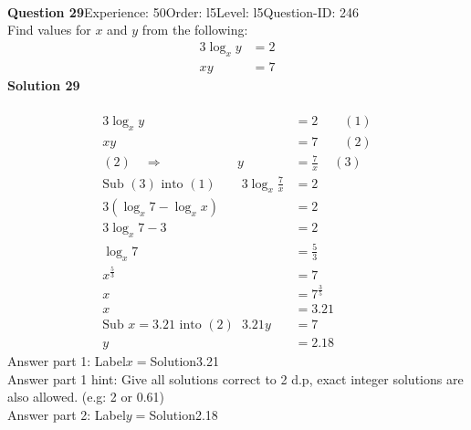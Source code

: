 \documentclass{article}
\begin{document}
\\[4pt]
\noindent\textbf{Question 29}\hspace{20pt}Experience: 50\hspace{20pt}Order: l5\hspace{20pt}Level: l5\hspace{20pt}Question-ID: 246\\[2pt]
Find values for $x$ and $y$ from the following:
\begin{align*}
3\log_{x}y&=2\\[2pt]
xy&=7
\end{align*}
\noindent\textbf{Solution 29}\\[2pt]
\\[-35pt]\begin{align*}
3\log_{x}y&=2\qquad (1)\\[2pt]
xy&=7\qquad (2)\\[2pt]
(2) \quad\Rightarrow\hspace{69pt} y&=\displaystyle\frac{7}{x}\hspace{14pt} (3)\\[2pt]
\text{Sub}\,\,(3)\,\,\text{into}\,\,(1)\qquad 3\log_{x}\displaystyle\frac{7}{x}&=2\\[2pt]
3(\log_{x}7-\log_{x}x)&=2\\[2pt]
3\log_{x}7-3&=2\\[2pt]
\log_{x}7&=\displaystyle\frac{5}{3}\\[2pt]
x^{\frac{5}{3}}&=7\\[2pt]
x&=7^{\frac{3}{5}}\\[2pt]
x&=3.21\\[12pt]
\text{Sub}\,\,x=3.21\,\,\text{into}\,\,(2)\hspace{7pt} 3.21y&=7\\[2pt]
y&=2.18
\end{align*}
Answer part 1: \hspace{10pt}Label\hspace{10pt}$x=$\hspace{10pt}Solution\hspace{10pt}3.21\\
Answer part 1 hint: \hspace{15pt}Give all solutions correct to 2 d.p, exact integer solutions are also allowed. (e.g: 2 or 0.61)\\
Answer part 2: \hspace{10pt}Label\hspace{10pt}$y=$\hspace{10pt}Solution\hspace{10pt}2.18\\
\end{document}
